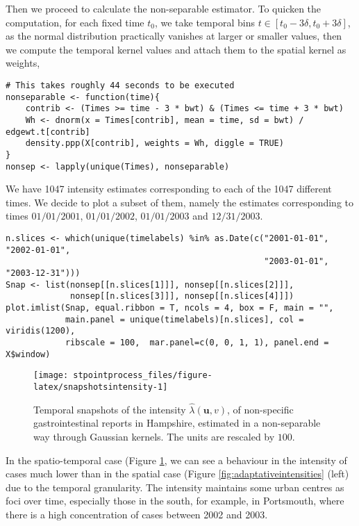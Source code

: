 Then we proceed to calculate the non-separable estimator. To quicken the computation, for each fixed time \(t_0\), we take temporal bins \(t\in [t_0-3\delta, t_0+3\delta]\), as the normal distribution practically vanishes at larger or smaller values, then we compute the temporal kernel values and attach them to the spatial kernel as weights,

\begin{verbatim}
# This takes roughly 44 seconds to be executed 
nonseparable <- function(time){
    contrib <- (Times >= time - 3 * bwt) & (Times <= time + 3 * bwt)
    Wh <- dnorm(x = Times[contrib], mean = time, sd = bwt) / edgewt.t[contrib]
    density.ppp(X[contrib], weights = Wh, diggle = TRUE)
}
nonsep <- lapply(unique(Times), nonseparable)
\end{verbatim}

We have 1047 intensity estimates corresponding to each of the 1047 different times. We decide to plot a subset of them, namely the estimates corresponding to times \(01/01/2001\), \(01/01/2002\), \(01/01/2003\) and \(12/31/2003\).

\begin{verbatim}
n.slices <- which(unique(timelabels) %in% as.Date(c("2001-01-01", "2002-01-01", 
                                                    "2003-01-01", "2003-12-31")))
Snap <- list(nonsep[[n.slices[1]]], nonsep[[n.slices[2]]], 
             nonsep[[n.slices[3]]], nonsep[[n.slices[4]]])
plot.imlist(Snap, equal.ribbon = T, ncols = 4, box = F, main = "", 
            main.panel = unique(timelabels)[n.slices], col = viridis(1200),
            ribscale = 100,  mar.panel=c(0, 0, 1, 1), panel.end = X$window)
\end{verbatim}

\begin{figure}

{\centering \texttt{[image: stpointprocess\_files/figure-latex/snapshotsintensity-1]} 

}

\caption{Temporal snapshots of the intensity $\hat{\lambda}(\mathbf{u},v)$, of non-specific gastrointestinal reports in Hampshire, estimated in a non-separable way through Gaussian kernels. The units are rescaled by $100$.}\label{fig:snapshotsintensity}
\end{figure}

In the spatio-temporal case (Figure \ref{fig:snapshotsintensity}, we can see a behaviour in the intensity of cases much lower than in the spatial case (Figure \ref{fig:adaptativeintensities} (left) due to the temporal granularity. The intensity maintains some urban centres as foci over time, especially those in the south, for example, in Portsmouth, where there is a high concentration of cases between 2002 and 2003.


